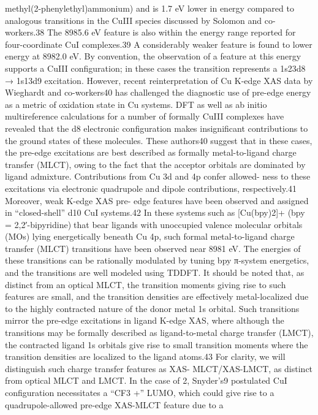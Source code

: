 methyl(2-phenylethyl)ammonium) and is 1.7 eV lower in
energy compared to analogous transitions in the CuIII species
discussed by Solomon and co-workers.38 The 8985.6 eV feature
is also within the energy range reported for four-coordinate CuI
complexes.39 A considerably weaker feature is found to lower
energy at 8982.0 eV. By convention, the observation of a
feature at this energy supports a CuIII conﬁguration; in these
cases the transition represents a 1s23d8 → 1s13d9 excitation.
However, recent reinterpretation of Cu K-edge XAS data by
Wieghardt and co-workers40 has challenged the diagnostic use
of pre-edge energy as a metric of oxidation state in Cu systems.
DFT as well as ab initio multireference calculations for a
number of formally CuIII complexes have revealed that the d8
electronic conﬁguration makes insigniﬁcant contributions to
the ground states of these molecules. These authors40 suggest
that in these cases, the pre-edge excitations are best described
as formally metal-to-ligand charge transfer (MLCT), owing to
the fact that the acceptor orbitals are dominated by ligand
admixture. Contributions from Cu 3d and 4p confer allowed-
ness to these excitations via electronic quadrupole and dipole
contributions, respectively.41 Moreover, weak K-edge XAS pre-
edge features have been observed and assigned in “closed-shell”
d10 CuI systems.42 In these systemssuch as [Cu(bpy)2]+ (bpy
= 2,2′-bipyridine)that bear ligands with unoccupied valence
molecular orbitals (MOs) lying energetically beneath Cu 4p,
such formal metal-to-ligand charge transfer (MLCT) transitions
have been observed near 8981 eV. The energies of these
transitions can be rationally modulated by tuning bpy π-system
energetics, and the transitions are well modeled using TDDFT.
It should be noted that, as distinct from an optical MLCT, the
transition moments giving rise to such features are small, and
the transition densities are eﬀectively metal-localized due to the
highly contracted nature of the donor metal 1s orbital. Such
transitions mirror the pre-edge excitations in ligand K-edge
XAS, where although the transitions may be formally described
as ligand-to-metal charge transfer (LMCT), the contracted
ligand 1s orbitals give rise to small transition moments where
the transition densities are localized to the ligand atoms.43 For
clarity, we will distinguish such charge transfer features as XAS-
MLCT/XAS-LMCT, as distinct from optical MLCT and
LMCT.
In the case of 2, Snyder’s9 postulated CuI conﬁguration
necessitates a “CF3
+” LUMO, which could give rise to a
quadrupole-allowed pre-edge XAS-MLCT feature due to a
